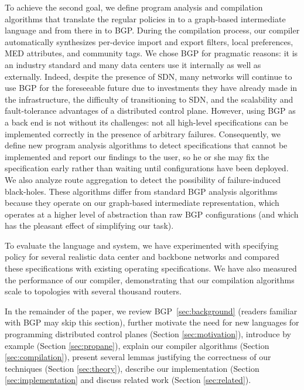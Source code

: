 To achieve the second goal, we define program analysis and compilation
algorithms that translate the regular policies in to a graph-based
intermediate language and from there in to BGP.  During the
compilation process, our compiler automatically synthesizes per-device
import and export filters, local preferences, MED attributes, and 
community tags.  We chose BGP for pragmatic reasons:  it is an industry
standard and many data centers use it internally as well as externally.
Indeed, despite the presence of SDN, many networks will continue to
use BGP for the foreseeable future due to investments they have already
made in the infrastructure, the difficulty of transitioning to SDN,
and the scalability and fault-tolerance advantages of a distributed
control plane.  However, using BGP as a back end is not without its 
challenges: not all high-level specifications can be implemented correctly in
the presence of arbitrary failures.  Consequently, we define new
program analysis algorithms to detect specifications that cannot be implemented
and report our findings to the user, so he or she may fix the specification
early rather than waiting until configurations have been deployed.  We also
analyze route aggregation to detect the possibility of failure-induced black-holes.
These algorithms differ from
standard BGP analysis algorithms~\cite{feamster:rcc,batfish} because they operate on 
our graph-based intermediate representation, which operates at a higher level
of abstraction than raw BGP configurations (and which has the pleasant effect of simplifying our 
task).

To evaluate the \sysname{} language and system, we have experimented with specifying policy
for several realistic data center and backbone networks and compared these specifications
with existing operating specifications. We have also
measured the performance of our compiler, demonstrating that our compilation
algorithms scale to topologies with several thousand routers.

In the remainder of the paper, we review BGP~\ref{sec:background} (readers
familiar with BGP may skip this section),
further motivate the need for new languages 
for programming distributed control planes (Section \ref{sec:motivation}),
introduce \sysname{} by example (Section \ref{sec:propane}), 
explain our compiler algorithms (Section \ref{sec:compilation}),
present several lemmas justifying the correctness of our techniques (Section \ref{sec:theory}), describe our implementation (Section \ref{sec:implementation}
and discuss related work (Section \ref{sec:related}).

